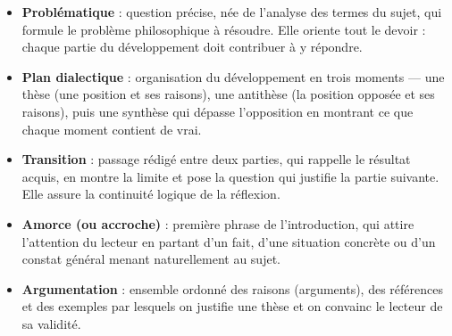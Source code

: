\documentclass[11pt]{article}
\begin{document}
\begin{corrige}
\begin{itemize}
\item \textbf{Problématique} : question précise, née de l'analyse des termes du sujet, qui formule le problème philosophique à résoudre. Elle oriente tout le devoir : chaque partie du développement doit contribuer à y répondre.
\item \textbf{Plan dialectique} : organisation du développement en trois moments — une thèse (une position et ses raisons), une antithèse (la position opposée et ses raisons), puis une synthèse qui dépasse l'opposition en montrant ce que chaque moment contient de vrai.
\item \textbf{Transition} : passage rédigé entre deux parties, qui rappelle le résultat acquis, en montre la limite et pose la question qui justifie la partie suivante. Elle assure la continuité logique de la réflexion.
\item \textbf{Amorce (ou accroche)} : première phrase de l'introduction, qui attire l'attention du lecteur en partant d'un fait, d'une situation concrète ou d'un constat général menant naturellement au sujet.
\item \textbf{Argumentation} : ensemble ordonné des raisons (arguments), des références et des exemples par lesquels on justifie une thèse et on convainc le lecteur de sa validité.
\end{itemize}
\end{corrige}
\end{document}
